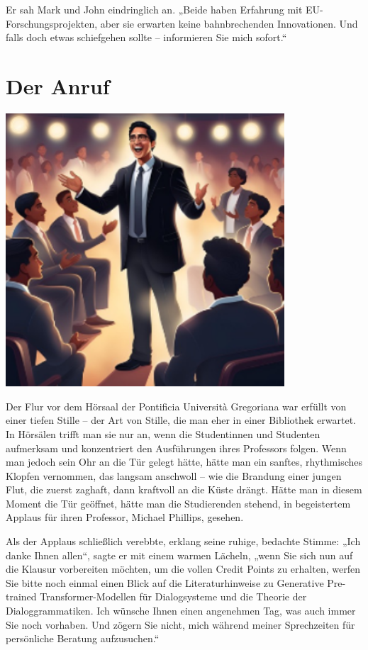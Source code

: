 \documentclass[
]{article}
\begin{document}
Er sah Mark und John eindringlich an. „Beide haben Erfahrung mit
EU-Forschungsprojekten, aber sie erwarten keine bahnbrechenden
Innovationen. Und falls doch etwas schiefgehen sollte -- informieren Sie
mich sofort.``

\section{Der Anruf}\label{der-anruf}

\includegraphics[width=4.09005in,height=4.01288in]{media/image12.png}

Der Flur vor dem Hörsaal der Pontificia Università Gregoriana war
erfüllt von einer tiefen Stille -- der Art von Stille, die man eher in
einer Bibliothek erwartet. In Hörsälen trifft man sie nur an, wenn die
Studentinnen und Studenten aufmerksam und konzentriert den Ausführungen
ihres Professors folgen. Wenn man jedoch sein Ohr an die Tür gelegt
hätte, hätte man ein sanftes, rhythmisches Klopfen vernommen, das
langsam anschwoll -- wie die Brandung einer jungen Flut, die zuerst
zaghaft, dann kraftvoll an die Küste drängt. Hätte man in diesem Moment
die Tür geöffnet, hätte man die Studierenden stehend, in begeistertem
Applaus für ihren Professor, Michael Phillips, gesehen.

Als der Applaus schließlich verebbte, erklang seine ruhige, bedachte
Stimme: „Ich danke Ihnen allen``, sagte er mit einem warmen Lächeln,
„wenn Sie sich nun auf die Klausur vorbereiten möchten, um die vollen
Credit Points zu erhalten, werfen Sie bitte noch einmal einen Blick auf
die Literaturhinweise zu Generative Pre-trained Transformer-Modellen für
Dialogsysteme und die Theorie der Dialoggrammatiken. Ich wünsche Ihnen
einen angenehmen Tag, was auch immer Sie noch vorhaben. Und zögern Sie
nicht, mich während meiner Sprechzeiten für persönliche Beratung
aufzusuchen.``
\end{document}
